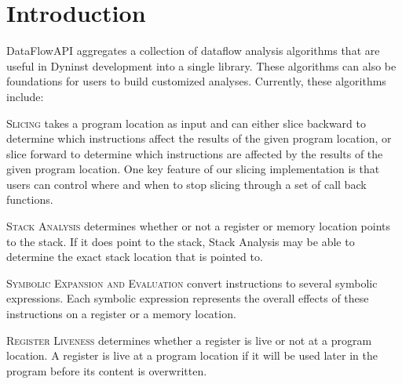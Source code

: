 \section{Introduction}
\label{sec:intro}

DataFlowAPI aggregates a collection of dataflow analysis algorithms that are
useful in Dyninst development into a single library. These algorithms can also
be foundations for users to build customized analyses. Currently, these algorithms include:

\begin{itemize}[leftmargin=0pt,label=$\circ$]

{\item {\scshape Slicing}
takes a program location as input and can either slice
backward to determine which instructions affect the results of the given program location, or
slice forward to determine which instructions are affected by the results of the
given program location. One key feature of our slicing implementation is that
users can control where and when to stop slicing through a set of call back
functions.
}

{\item {\scshape Stack Analysis}
determines whether or not a register or memory location points to the stack.  If it does point to the stack, Stack Analysis may be able to determine the exact stack location that is pointed to.
}

{\item {\scshape Symbolic Expansion and Evaluation}
convert instructions to
several symbolic expressions. Each symbolic expression represents the overall effects of
these instructions on a register or a memory location.
}

{\item {\scshape Register Liveness}
determines whether a register is live or not at a program
location. A register is live at a program location if it will be used later in the program before its
content is overwritten. 
}
\end{itemize}
